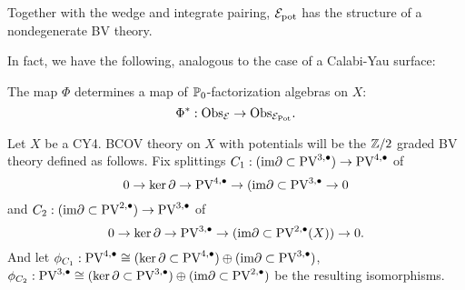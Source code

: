 \documentclass[11pt]{article}
\begin{document}
Together with the wedge and integrate pairing, $\mathcal{E}_{\rm pot}$ has the structure of a nondegenerate BV theory.

In fact, we have the following, analogous to the case of a Calabi-Yau surface:
\begin{prop}
The map $\Phi$ determines a map of $\mathbb{P}_0$-factorization algebras on $X$:
\[
\Phi^* : {\rm Obs}_{\mathcal{E}} \to {\rm Obs}_{\mathcal{E}_{\rm Pot}} .
\]
\end{prop} 

Let \(X\) be a CY4. BCOV theory on \(X\) with potentials will be the \(\mathbb{Z}/2\) graded BV theory defined as follows. Fix splittings \(C_1: (\text{im}\partial\subset\text{PV}^{3,\bullet})\to \text{PV}^{4,\bullet}\) of  \[0\to\ker\partial\to \text{PV}^{4,\bullet}\to(\text{im}\partial\subset\text{PV}^{3,\bullet}\to 0\] and \(C_2: (\text{im}\partial\subset\text{PV}^{2,\bullet})\to\text{PV}^{3,\bullet}\) of \[0\to\ker\partial\to\text{PV}^{3,\bullet}\to(\text{im}\partial\subset\text{PV}^{2,\bullet}(X))\to 0.\] And let \(\phi_{C_1} : \text{PV}^{4,\bullet}\cong(\ker\partial\subset\text{PV}^{4,\bullet})\oplus(\text{im}\partial\subset\text{PV}^{3,\bullet})\), \(\phi_{C_2}: \text{PV}^{3,\bullet}\cong(\ker\partial\subset\text{PV}^{3,\bullet})\oplus(\text{im}\partial\subset\text{PV}^{2,\bullet})\) be the resulting isomorphisms.
\end{document}
